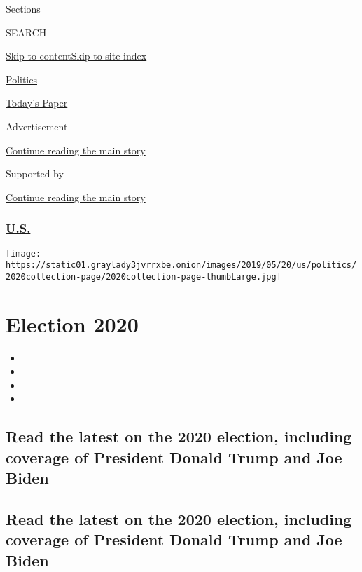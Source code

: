 Sections

SEARCH

\protect\hyperlink{site-content}{Skip to
content}\protect\hyperlink{site-index}{Skip to site index}

\href{https://www.nytimes3xbfgragh.onion/section/politics}{Politics}

\href{https://myaccount.nytimes3xbfgragh.onion/auth/login?response_type=cookie\&client_id=vi}{}

\href{https://www.nytimes3xbfgragh.onion/section/todayspaper}{Today's
Paper}

Advertisement

\protect\hyperlink{after-top}{Continue reading the main story}

Supported by

\protect\hyperlink{after-sponsor}{Continue reading the main story}

\hypertarget{us}{%
\subsubsection{\texorpdfstring{\href{/section/us}{U.S.}}{U.S.}}\label{us}}

\texttt{[image: https://static01.graylady3jvrrxbe.onion/images/2019/05/20/us/politics/2020collection-page/2020collection-page-thumbLarge.jpg]}

\hypertarget{election-2020}{%
\section{Election 2020}\label{election-2020}}

\begin{itemize}
\item
\item
\item
\item
\end{itemize}

\hypertarget{read-the-latest-on-the-2020-election-including-coverage-of-president-donald-trump-and-joe-biden}{%
\subsection{Read the latest on the 2020 election, including coverage of
President Donald Trump and Joe
Biden}\label{read-the-latest-on-the-2020-election-including-coverage-of-president-donald-trump-and-joe-biden}}

\hypertarget{read-the-latest-on-the-2020-election-including-coverage-of-president-donald-trump-and-joe-biden-1}{%
\subsection{Read the latest on the 2020 election, including coverage of
President Donald Trump and Joe
Biden}\label{read-the-latest-on-the-2020-election-including-coverage-of-president-donald-trump-and-joe-biden-1}}

